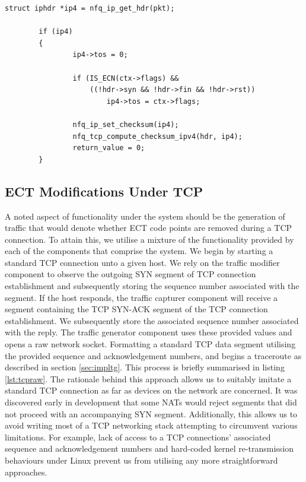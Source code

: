 \documentclass{l4proj}
\begin{document}
\begin{lstlisting}[caption={A demonstration of userspace modification of the traffic class byte on packets queued by the operating system kernel for transmission on the network.}]
struct iphdr *ip4 = nfq_ip_get_hdr(pkt);

        if (ip4)
        {
                ip4->tos = 0;

                if (IS_ECN(ctx->flags) && 
                    ((!hdr->syn && !hdr->fin && !hdr->rst))
                        ip4->tos = ctx->flags;

                nfq_ip_set_checksum(ip4);
                nfq_tcp_compute_checksum_ipv4(hdr, ip4);
                return_value = 0;
        }
\end{lstlisting}
\label{lst:libnf}


\subsection{ECT Modifications Under TCP}
\label{sec:tcponpath}


A noted aspect of functionality under the system should be the generation of traffic that would denote whether ECT code points are removed during a TCP connection. To attain this, we utilise a mixture of the functionality provided by each of the components that comprise the system. We begin by starting a standard TCP connection unto a given host. We rely on the traffic modifier component to observe the outgoing SYN segment of TCP connection establishment and subsequently storing the sequence number associated with the segment. If the host responds, the traffic capturer component will receive a segment containing the TCP SYN-ACK segment of the TCP connection establishment. We subsequently store the associated sequence number associated with the reply. The traffic generator component uses these provided values and opens a raw network socket. Formatting a standard TCP data segment utilising the provided sequence and acknowledgement numbers, and begins a traceroute as described in section \ref{sec:impltg}. This process is briefly summarised in listing \ref{lst:tcpraw}. The rationale behind this approach allows us to suitably imitate a standard TCP connection as far as devices on the network are concerned. It was discovered early in development that some NATs would reject segments that did not proceed with an accompanying SYN segment. Additionally, this allows us to avoid writing most of a TCP networking stack attempting to circumvent various limitations. For example, lack of access to a TCP connections' associated sequence and acknowledgement numbers and hard-coded kernel re-transmission behaviours under Linux prevent us from utilising any more straightforward approaches.
\end{document}
